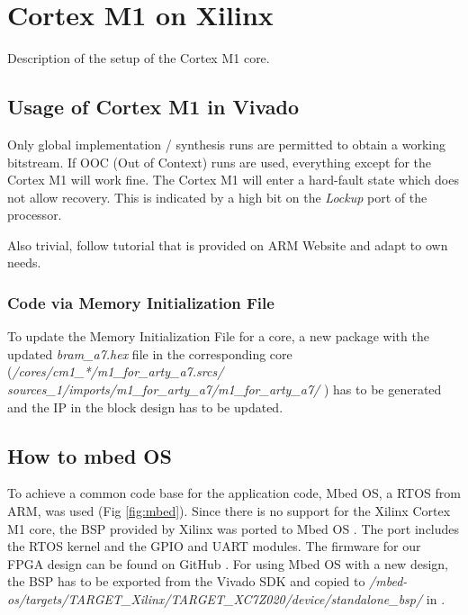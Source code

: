 \chapter{Cortex M1 on Xilinx}

Description of the setup of the Cortex M1 core. \cite{arm_arm_2018} \cite{arm_cortex-m1_nodate}

\section{Usage of Cortex M1 in Vivado}

Only global implementation / synthesis runs are permitted to obtain a working bitstream.
If OOC (Out of Context) runs are used, everything except for the Cortex M1 will work fine. 
The Cortex M1 will enter a hard-fault state which does not allow recovery. 
This is indicated by a high bit on the \textit{Lockup} port of the processor.

Also trivial, follow tutorial that is provided on ARM Website and adapt to own needs.

\subsection{Code via Memory Initialization File}

To update the Memory Initialization File for a core, a new package with the updated \textit{bram\_a7.hex} file in the corresponding core (\textit{/cores/cm1\_*/m1\_for\_arty\_a7.srcs/\\sources\_1/imports/m1\_for\_arty\_a7/m1\_for\_arty\_a7/} \cite{fpga_design}) has to be generated and the \gls{IP} in the block design has to be updated.

\section{How to mbed OS}
To achieve a common code base for the application code, Mbed OS, a \gls{RTOS} from ARM, was used (Fig \ref{fig:mbed}). 
Since there is no support for the Xilinx Cortex M1 core, the \gls{BSP} provided by Xilinx was ported to Mbed OS \cite{mbed_port}. 
The port includes the \gls{RTOS} kernel and the GPIO and UART modules. 
The firmware for our \gls{FPGA} design \cite{fpga_design} can be found on GitHub \cite{firmware}. 
For using Mbed OS with a new design, the \gls{BSP} has to be exported from the Vivado SDK and copied to \textit{/mbed-os/targets/TARGET\_Xilinx/TARGET\_XC7Z020/device/standalone\_bsp/} in \cite{firmware}.

